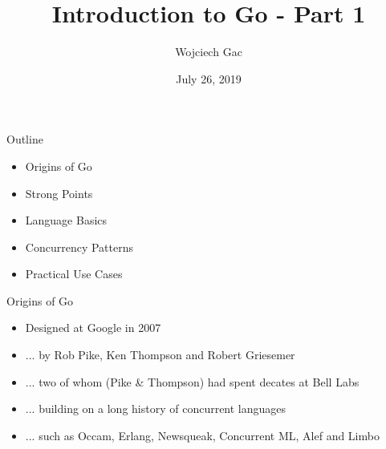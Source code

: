 \documentclass[pdf,xcolor=dvipsnames,noparindent]{beamer}
\title{Introduction to Go - Part 1}
\author{Wojciech Gac}
\date{July 26, 2019}
\begin{document}
\begin{frame}
	\titlepage
\end{frame}


	  

\begin{frame}{Outline}
  \pause
  \begin{itemize}
  \item Origins of Go
    \pause
  \item Strong Points
    \pause
  \item Language Basics
    \pause
  \item Concurrency Patterns
    \pause
  \item Practical Use Cases
    \pause
  \end{itemize}
\end{frame}

\begin{frame}{Origins of Go}
  \pause
  \begin{itemize}
  \item Designed at Google in 2007
    \pause
  \item ... by Rob Pike, Ken Thompson and Robert Griesemer
    \pause
  \item ... two of whom (Pike \& Thompson) had spent decates at Bell Labs
    \pause
  \item ... building on a long history of concurrent languages
    \pause
  \item ... such as Occam, Erlang, Newsqueak, Concurrent ML, Alef and Limbo
  \end{itemize}
  
\end{frame}
\end{document}
